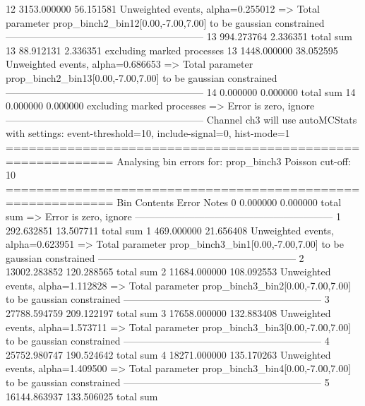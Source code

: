 12         3153.000000     56.151581       Unweighted events, alpha=0.255012
  => Total parameter prop_binch2_bin12[0.00,-7.00,7.00] to be gaussian constrained
------------------------------------------------------------
13         994.273764      2.336351        total sum                     
13         88.912131       2.336351        excluding marked processes    
13         1448.000000     38.052595       Unweighted events, alpha=0.686653
  => Total parameter prop_binch2_bin13[0.00,-7.00,7.00] to be gaussian constrained
------------------------------------------------------------
14         0.000000        0.000000        total sum                     
14         0.000000        0.000000        excluding marked processes    
  => Error is zero, ignore      
------------------------------------------------------------
Channel ch3 will use autoMCStats with settings: event-threshold=10, include-signal=0, hist-mode=1
============================================================
Analysing bin errors for: prop_binch3
Poisson cut-off: 10
============================================================
Bin        Contents        Error           Notes                         
0          0.000000        0.000000        total sum                     
  => Error is zero, ignore      
------------------------------------------------------------
1          292.632851      13.507711       total sum                     
1          469.000000      21.656408       Unweighted events, alpha=0.623951
  => Total parameter prop_binch3_bin1[0.00,-7.00,7.00] to be gaussian constrained
------------------------------------------------------------
2          13002.283852    120.288565      total sum                     
2          11684.000000    108.092553      Unweighted events, alpha=1.112828
  => Total parameter prop_binch3_bin2[0.00,-7.00,7.00] to be gaussian constrained
------------------------------------------------------------
3          27788.594759    209.122197      total sum                     
3          17658.000000    132.883408      Unweighted events, alpha=1.573711
  => Total parameter prop_binch3_bin3[0.00,-7.00,7.00] to be gaussian constrained
------------------------------------------------------------
4          25752.980747    190.524642      total sum                     
4          18271.000000    135.170263      Unweighted events, alpha=1.409500
  => Total parameter prop_binch3_bin4[0.00,-7.00,7.00] to be gaussian constrained
------------------------------------------------------------
5          16144.863937    133.506025      total sum                     
